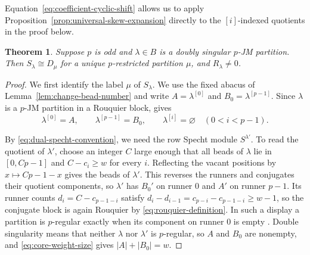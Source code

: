 \documentclass[12pt,reqno,a4paper]{amsart}
\numberwithin{equation}{section}
\numberwithin{figure}{section}
\theoremstyle{plain}
\newtheorem{theorem}{Theorem}[section]
\theoremstyle{definition}
\newcommand{\emptypar}{\varnothing}
\begin{document}
Equation~\eqref{eq:coefficient-cyclic-shift} allows us to apply
Proposition~\ref{prop:universal-skew-expansion} directly to the
$[i]$-indexed quotients in the proof below.

\begin{theorem}
\label{thm:rouquier-nonvanishing}
Suppose $p$ is odd and $\lambda\in B$ is a doubly singular
$p$-JM partition.  Then $S_\lambda\cong D_\mu$ for a unique $p$-restricted partition
$\mu$, and $R_\lambda\neq0$.
\end{theorem}

\begin{proof}
We first identify the label $\mu$ of $S_\lambda$.  We use the fixed
abacus of Lemma~\ref{lem:change-bead-number} and write
$A=\lambda^{[0]}$ and $B_0=\lambda^{[p-1]}$.
Since $\lambda$ is a $p$-JM partition in a Rouquier block,
\cite[Lemma~4.1]{Fayers} gives
\begin{equation}\label{eq:rouquier-jm-form}
 \lambda^{[0]}=A,\qquad \lambda^{[p-1]}=B_0,\qquad
 \lambda^{[i]}=\emptypar\quad(0<i<p-1).
\end{equation}

By \eqref{eq:dual-specht-convention}, we need the row Specht module
$S^{\lambda'}$.  To read the quotient of $\lambda'$, choose an integer
$C$ large enough that all beads of $\lambda$ lie in $[0,Cp-1]$ and
$C-c_i\geq w$ for every $i$.  Reflecting the vacant positions by
$x\mapsto Cp-1-x$ gives the beads of $\lambda'$.  This reverses the
runners and conjugates their quotient components, so $\lambda'$ has
$B_0'$ on runner $0$ and $A'$ on runner $p-1$.  Its runner counts
$d_i=C-c_{p-1-i}$ satisfy
$d_i-d_{i-1}=c_{p-i}-c_{p-1-i}\geq w-1$, so the conjugate block
is again Rouquier by \eqref{eq:rouquier-definition}.  In such a
display a partition is $p$-regular exactly when its component on runner
$0$ is empty \cite[Section~1.1.3]{Fayers}.  Double singularity means
that neither $\lambda$ nor $\lambda'$ is $p$-regular, so $A$ and $B_0$
are nonempty, and
\eqref{eq:core-weight-size} gives $|A|+|B_0|=w$.


\end{proof}
\end{document}
